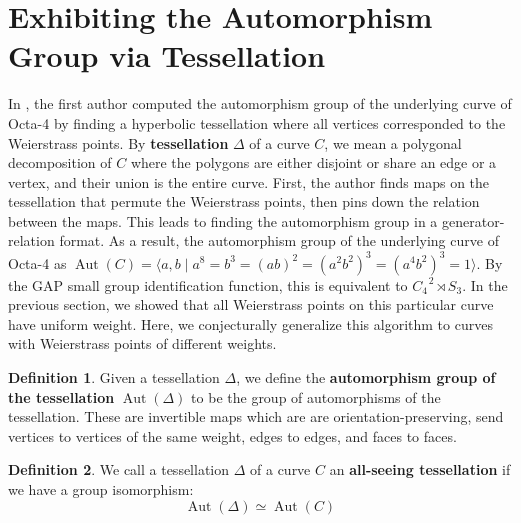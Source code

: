 \documentclass[12pt,reqno]{amsart}
\DeclareMathOperator{\Aut}{Aut}
\theoremstyle{definition}
\newtheorem{defn}{Definition}
\theoremstyle{remark}
\begin{document}
\section{Exhibiting the Automorphism Group via Tessellation}
\label{sec:flagflag}


In \cite{dami}, the first author computed the automorphism group of the underlying curve of Octa-4 by finding a hyperbolic tessellation where all vertices corresponded to the Weierstrass points. By \textbf{tessellation} $\Delta$ of a curve $C$, we mean a polygonal decomposition of $C$ where the polygons are either disjoint or share an edge or a vertex, and their union is the entire curve. First, the author finds maps on the tessellation that permute the Weierstrass points, then pins down the relation between the maps. This leads to finding the automorphism group in a generator-relation format. As a result, the automorphism group of the underlying curve of Octa-4 as $\Aut(C) = \langle a, b \mid a^8 = b^3 = (ab) ^2 = (a^2b^2)^3 = (a^4b^2)^3 = 1 \rangle.$ By the GAP small group identification function, this is equivalent to $C_4^{\text{ }2} \rtimes S_3.$ In the previous section, we showed that all Weierstrass points on this particular curve have uniform weight. Here, we conjecturally generalize this algorithm to curves with Weierstrass points of different weights. 


\begin{defn} Given a tessellation $\Delta$, we define the \textbf{automorphism group of the tessellation} $\Aut(\Delta)$ to be the group of automorphisms of the tessellation. These are invertible maps which are are orientation-preserving, send vertices to vertices of the same weight, edges to edges, and faces to faces. \end{defn} 




\begin{defn} We call a tessellation $\Delta$ of a curve $C$ an \textbf{all-seeing tessellation} if we have a group isomorphism: $$\Aut(\Delta) \simeq \Aut(C)$$ 
\end{defn}
\end{document}
